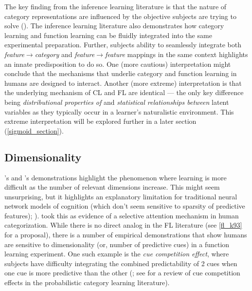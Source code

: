 \documentclass[12pt]{article}
\let\oldcite=\cite
\let\oldtextcite=\textcite
\renewcommand{\cite}[1]{\textcolor[rgb]{0, .121, .388}{\oldcite{#1}}}
\renewcommand{\textcite}[1]{\textcolor[rgb]{0, .121, .388}{\oldtextcite{#1}}}
\begin{document}
The key finding from the inference learning literature is that the nature of category representations are influenced by the objective subjects are trying to solve (\cite{yamauchi1998category,chin2004diagnosticity,ell2020learning}). The inference learning literature also demonstrates how category learning and function learning can be fluidly integrated into the same experimental preparation. Further, subjects ability to seamlessly integrate both \emph{feature}$\rightarrow$\emph{category} and \emph{feature}$\rightarrow$\emph{feature} mappings in the same context highlights an innate predisposition to do so. One (more cautious) interpretation might conclude that the mechanisms that underlie category and function learning in humans are designed to interact. Another (more extreme) interpretation is that the underlying mechanism of CL and FL are identical --- the only key difference being \emph{distributional properties of} and \emph{statistical relationships between} latent variables as they typically occur in a learner's naturalistic environment. This extreme interpretation will be explored further in a later section (\ref{sigmoid_section}).

\subsection{Dimensionality}

\textcite{shepard1961learning}'s and \textcite{kruschke1993human}'s demonstrations highlight the phenomenon where learning is more difficult as the number of relevant dimensions increase. This might seem unsurprising, but it highlights an explanatory limitation for traditional neural network models of cognition (which don't seem sensitive to sparsity of predictive features); \cite{kruschke1993human}). \textcite{kruschke1993human} took this as evidence of a selective attention mechanism in human categorization. While there is no direct analog in the FL literature (see \ref{fl_k93} for a proposal), there is a number of empirical demonstrations that show humans are sensitive to dimensionality (or, number of predictive cues) in a function learning experiment. One such example is the \emph{cue competition effect}, where subjects have difficulty integrating the combined predictability of 2 cues when one cue is more predictive than the other (\cite{busemeyer1993cue}; see \cite{kruschke1999model} for a review of cue competition effects in the probabilistic category learning literature). 
\end{document}
